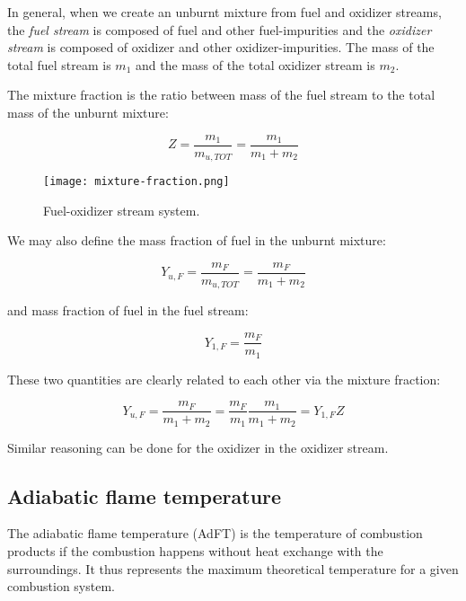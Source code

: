 \documentclass[10pt,twocolumn]{article}
\begin{document}
In general, when we create an unburnt mixture from fuel and oxidizer streams, the \textit{fuel stream} is composed of fuel and other fuel-impurities and the \textit{oxidizer stream} is composed of oxidizer and other oxidizer-impurities. The mass of the total fuel stream is $m_1$ and the mass of the total oxidizer stream is $m_2$.

The mixture fraction is the ratio between mass of the fuel stream to the total mass of the unburnt mixture:

\begin{equation}
Z = \frac{m_1}{m_{u, TOT}} = \frac{m_1}{m_1 + m_2}
\end{equation}

\begin{figure}[H]
\centering\texttt{[image: mixture-fraction.png]}
\caption{Fuel-oxidizer stream system.}			
\label{fig:mixture-fraction}
\end{figure}

We may also define the mass fraction of fuel in the unburnt mixture:

\begin{equation}
Y_{u, F} = \frac{m_F}{m_{u, TOT}} = \frac{m_F}{m_1 + m_2}
\end{equation}

and mass fraction of fuel in the fuel stream:

\begin{equation}
Y_{1, F} = \frac{m_F}{m_1}
\end{equation}

These two quantities are clearly related to each other via the mixture fraction:

\begin{equation}
Y_{u, F} = \frac{m_F}{m_1 + m_2} = \frac{m_F}{m_1} \frac{m_1}{m_1 + m_2} = Y_{1, F} Z
\end{equation}

Similar reasoning can be done for the oxidizer in the oxidizer stream.





\subsection{Adiabatic flame temperature}

The adiabatic flame temperature (AdFT) is the temperature of combustion products if the combustion happens without heat exchange with the surroundings. It thus represents the maximum theoretical temperature for a given combustion system.
\end{document}

